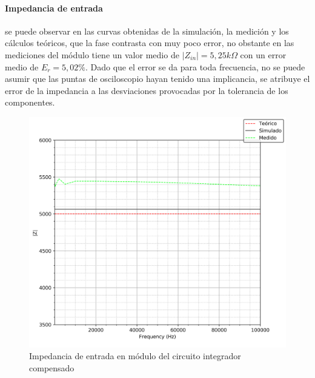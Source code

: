 \paragraph*{Impedancia de entrada} se puede observar en las curvas obtenidas de la simulaci\'on, la medici\'on y los c\'alculos
te\'oricos, que la fase contrasta con muy poco error, no obstante en las mediciones del m\'odulo tiene un valor medio de 
$|Z_{in}| = 5,25k \Omega$ con un error medio de $E_r = 5,02\% $. Dado que el error se da para toda frecuencia, no se puede asumir que las puntas
de osciloscopio hayan tenido una implicancia, se atribuye el error de la impedancia a las desviaciones provocadas por la tolerancia de los componentes.

\begin{figure}[H]
	\centering
	\includegraphics[scale=0.6]{../EJ4/Recursos/Integrador_compensado/impedancia_modulo.png}
	\caption{Impedancia de entrada en m\'odulo del circuito integrador compensado}
	\label{fig:integrador_compensado_impedancia_modulo}
\end{figure}

